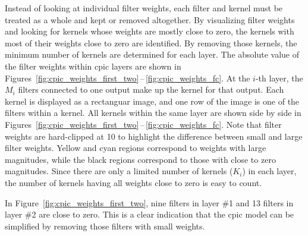 \documentclass{article}
\begin{document}
Instead of looking at individual filter weights, each filter and kernel must be treated as a whole and kept or removed altogether.
By visualizing filter weights and looking for kernels whose weights are mostly close to zero, the kernels with most of their weights close to zero are identified. 
By removing those kernels, the minimum number of kernels are determined for each layer.
The absolute value of the filter weights within \gls{cpic} layers are shown in  Figures~\ref{fig:cpic_weights_first_two}\,--\,\ref{fig:cpic_weights_fc}.
At the $i$-th layer, the $M_i$ filters connected to one output make up the kernel for that output.
Each kernel is displayed as a rectanguar image, and one row of the image is one of the filters within a kernel.
All kernels within the same layer are shown side by side in Figures~\ref{fig:cpic_weights_first_two}\,--\,\ref{fig:cpic_weights_fc}.
Note that filter weights are hard-clipped at 10 to highlight the difference between small and large filter weights.
Yellow and cyan regions correspond to weights with large magnitudes, while the black regions correspond to those with close to zero magnitudes.
Since there are only a limited number of kernels ($K_i$) in each layer, the number of kernels having all weights close to zero is easy to count.
%
\begin{table}
    \centering
    \caption{Number of kernels in each layer of the \gls{cpic} model during every iteration of the network pruning process.}
    \label{tab:pruning}
\end{table}
%
In Figure~\ref{fig:cpic_weights_first_two}, nine filters in layer \#1 and 13 filters in layer \#2 are close to zero.
This is a clear indication that the \gls{cpic} model can be simplified by removing those filters with small weights.
\end{document}
